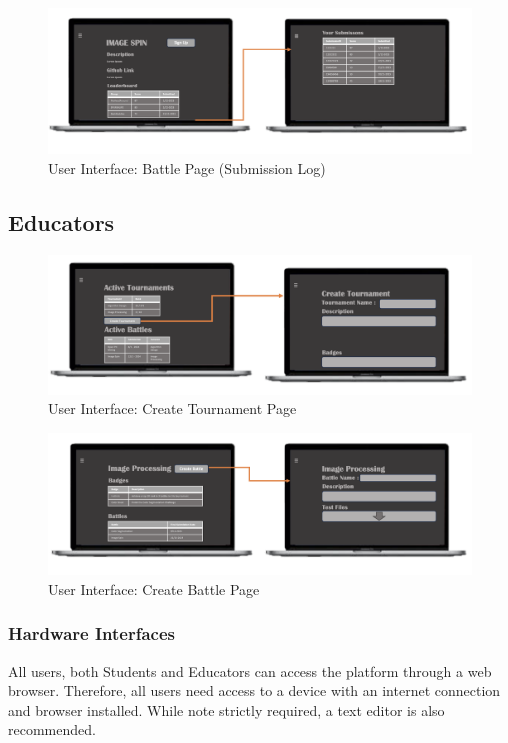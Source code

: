 \begin{figure}[Htbp!]
    \centering
    \includegraphics[width=\textwidth]{Graphics/SUBMISSION LOG.png}
    \caption{User Interface: Battle Page (Submission Log)}
    \label{fig:submissionlog}
\end{figure}

\subsection{Educators}

\begin{figure}[Htbp!]
    \centering
    \includegraphics[width=\textwidth]{Graphics/CREATE TOURNAMENT.png}
    \caption{User Interface: Create Tournament Page}
    \label{fig:createTournament}
\end{figure}


\begin{figure}[Htbp!]
    \centering
    \includegraphics[width=\textwidth]{Graphics/CREATE BATTLE.png}
    \caption{User Interface: Create Battle Page}
    \label{fig:createBattle}
\end{figure}


\subsubsection{Hardware Interfaces}
All users, both Students and Educators can access the platform through a web browser. Therefore, all users need access to a device with an internet connection and browser installed. While note strictly required, a text editor is also recommended. 

